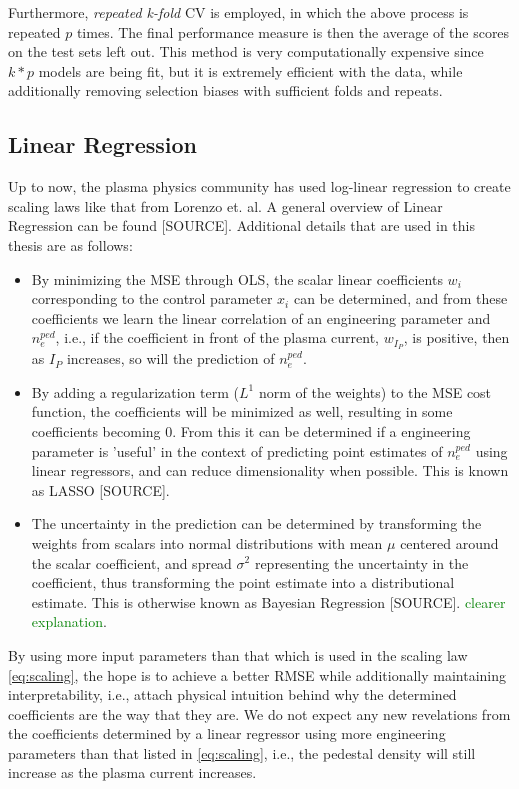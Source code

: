 \documentclass[a4paper, twoside, final, 12pt]{article}
\begin{document}
Furthermore, \textit{repeated k-fold} CV is employed, in which the above process is repeated $p$ times.
The final performance measure is then the average of the scores on the test sets left out.
This method is very computationally expensive since $k*p$ models are being fit, but it is extremely efficient with the data, while additionally removing selection biases with sufficient folds and repeats.

\subsection{Linear Regression}
Up to now, the plasma physics community has used log-linear regression to create scaling laws like that from Lorenzo et. al.
A general overview of Linear Regression can be found [SOURCE]. 
Additional details that are used in this thesis are as follows: 
\begin{itemize}
	\item By minimizing the MSE through OLS, the scalar linear coefficients $w_i$ corresponding to the control parameter $x_i$ can be determined, and from these coefficients we learn the linear correlation of an engineering parameter and $n_e^{ped}$, i.e., if the coefficient in front of the plasma current, $w_{I_P}$, is positive, then as $I_P$ increases, so will the prediction of $n_e^{ped}$.
	\item By adding a regularization term ($L^1$ norm of the weights) to the MSE cost function, the coefficients will be minimized as well, resulting in some coefficients becoming 0. From this it can be determined if a engineering parameter is 'useful' in the context of predicting point estimates of $n_e^{ped}$ using linear regressors, and can reduce dimensionality when possible. This is known as LASSO [SOURCE].
	\item The uncertainty in the prediction can be determined by transforming the weights from scalars into normal distributions with mean $\mu$ centered around the scalar coefficient, and spread $\sigma^2$ representing the uncertainty in the coefficient, thus transforming the point estimate into a distributional estimate. This is otherwise known as Bayesian Regression [SOURCE]. \textcolor{green}{clearer explanation}.
\end{itemize}

By using more input parameters than that which is used in the scaling law \ref{eq:scaling}, the hope is to achieve a better RMSE while additionally maintaining interpretability, i.e., attach physical intuition behind why the determined coefficients are the way that they are.
We do not expect any new revelations from the coefficients determined by a linear regressor using more engineering parameters than that listed in \ref{eq:scaling}, i.e., the pedestal density will still increase as the plasma current increases.
\end{document}
